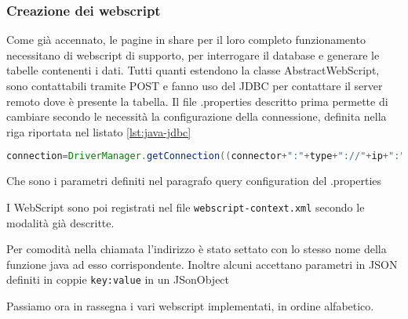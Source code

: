 \subsubsection{Creazione dei webscript}
Come già accennato, le pagine in share per il loro completo funzionamento necessitano di webscript di supporto, per interrogare il database e generare le tabelle contenenti i dati.  Tutti quanti estendono la classe AbstractWebScript, sono contattabili tramite POST e fanno uso del JDBC per contattare il server remoto dove è presente la tabella. Il file .properties descritto prima permette di cambiare secondo le necessità la configurazione della connessione, definita nella riga riportata nel listato \ref{lst:java-jdbc}
\begin{lstlisting}[language=Java, caption=connesione tramite JDBC, label=lst:java-jdbc]
connection=DriverManager.getConnection((connector+":"+type+"://"+ip+":"+port+"/"+server),id,password);
\end{lstlisting}
Che sono i parametri definiti nel paragrafo query configuration del .properties

I WebScript sono poi registrati nel file \texttt{webscript-context.xml} secondo le modalità già descritte.

Per comodità nella chiamata l’indirizzo è stato settato con lo stesso nome della funzione java ad esso corrispondente. Inoltre alcuni  accettano parametri in JSON definiti in coppie \texttt{{key:value}} in un JSonObject

Passiamo ora in rassegna i vari webscript implementati, in ordine alfabetico.
